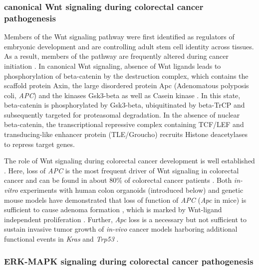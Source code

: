 \begin{flushleft}
\subsubsection{canonical Wnt signaling during colorectal cancer pathogenesis}

Members of the Wnt signaling pathway were first identified as regulators of embryonic development \parencite{sharmaEffectWinglessWg11976, nusslein-volhardMutationsAffectingSegment1980} and are controlling adult stem cell identity across tissues. As a result, members of the pathway are frequently altered during cancer initiation \parencite{zhanWntSignalingCancer2017}. In canonical Wnt signaling, absence of Wnt ligands leads to phosphorylation of beta-catenin by the destruction complex, which contains the scaffold protein Axin, the large disordered protein Apc (Adenomatous polyposis coli, \textit{APC}) and the kinases Gsk3-beta as well as Casein kinase \parencite{zhanWntSignalingCancer2017}. 
In this state, beta-catenin is phosphorylated by Gsk3-beta, ubiquitinated by beta-TrCP and subsequently targeted for proteasomal degradation. In the absence of nuclear beta-catenin, the transcriptional repressive complex containing TCF/LEF and transducing-like enhancer protein (TLE/Groucho) recruits Histone deacetylases to repress target genes. \par 

The role of Wnt signaling during colorectal cancer development is well established \parencite{polakisManyWaysWnt2007}. Here, loss of \textit{APC} is the most frequent driver of Wnt signaling in colorectal cancer and can be found in about 80\% of colorectal cancer patients \parencite{fearonMolecularGeneticsColorectal2011, zhanWntSignalingCancer2017}. Both \textit{in-vitro} experiments with human colon organoids (introduced below) and genetic mouse models have demonstrated that loss of function of \textit{APC} (\textit{Apc} in mice) is sufficient to cause adenoma formation \parencite{moserApcMinMouseModel1995}, which is marked by Wnt-ligand independent proliferation \parencite{matanoModelingColorectalCancer2015a, drostSequentialCancerMutations2015}. Further, \textit{Apc} loss is a necessary but not sufficient to sustain invasive tumor growth of \textit{in-vivo} cancer models harboring additional functional events in \textit{Kras} and \textit{Trp53} \parencite{dowApcRestorationPromotes2015a, sakaiCombinedMutationApc2018a}.
\par

\subsubsection{ERK-MAPK signaling during colorectal cancer pathogenesis}


\end{flushleft}
